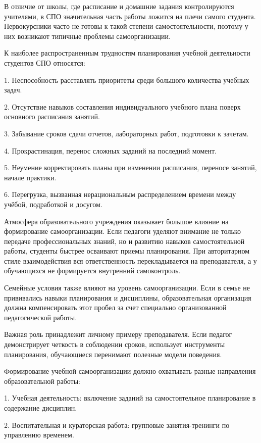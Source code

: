 \documentclass[
]{article}
\begin{document}
В отличие от школы, где расписание и домашние задания контролируются
учителями, в СПО значительная часть работы ложится на плечи самого
студента. Первокурсники часто не готовы к такой степени
самостоятельности, поэтому у них возникают типичные проблемы
самоорганизации.

К наиболее распространенным трудностям планирования учебной деятельности
студентов СПО относятся:

1. Неспособность расставлять приоритеты среди большого количества
учебных задач.

2. Отсутствие навыков составления индивидуального учебного плана поверх
основного расписания занятий.

3. Забывание сроков сдачи отчетов, лабораторных работ, подготовки к
зачетам.

4. Прокрастинация, перенос сложных заданий на последний момент.

5. Неумение корректировать планы при изменении расписания, переносе
занятий, начале практики.

6. Перегрузка, вызванная нерациональным распределением времени между
учёбой, подработкой и досугом.

Атмосфера образовательного учреждения оказывает большое влияние на
формирование самоорганизации. Если педагоги уделяют внимание не только
передаче профессиональных знаний, но и развитию навыков самостоятельной
работы, студенты быстрее осваивают приемы планирования. При авторитарном
стиле взаимодействия вся ответственность перекладывается на
преподавателя, а у обучающихся не формируется внутренний самоконтроль.

Семейные условия также влияют на уровень самоорганизации. Если в семье
не прививались навыки планирования и дисциплины, образовательная
организация должна компенсировать этот пробел за счет специально
организованной педагогической работы.

Важная роль принадлежит личному примеру преподавателя. Если педагог
демонстрирует четкость в соблюдении сроков, использует инструменты
планирования, обучающиеся перенимают полезные модели поведения.

Формирование учебной самоорганизации должно охватывать разные
направления образовательной работы:

1. Учебная деятельность: включение заданий на самостоятельное
планирование в содержание дисциплин.

2. Воспитательная и кураторская работа: групповые занятия-тренинги по
управлению временем.
\end{document}
